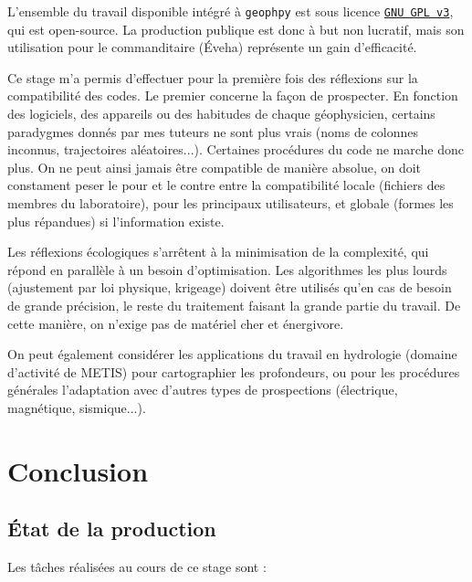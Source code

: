 \documentclass[12pt]{article}
\begin{document}
    L'ensemble du travail disponible intégré à \texttt{geophpy} est sous licence \href{https://www.gnu.org/licenses/gpl-3.0.en.html}{\texttt{GNU GPL v3}}, qui est open-source. La production publique est donc à but non lucratif, mais son utilisation pour le commanditaire (Éveha) représente un gain d'efficacité.

    Ce stage m'a permis d'effectuer pour la première fois des réflexions sur la compatibilité des codes. Le premier concerne la façon de prospecter. En fonction des logiciels, des appareils ou des habitudes de chaque géophysicien, certains paradygmes donnés par mes tuteurs ne sont plus vrais (noms de colonnes inconnus, trajectoires aléatoires...). Certaines procédures du code ne marche donc plus. On ne peut ainsi jamais être compatible de manière absolue, on doit constament peser le pour et le contre entre la compatibilité locale (fichiers des membres du laboratoire), pour les principaux utilisateurs, et globale (formes les plus répandues) si l'information existe.

    \vskip 15pt

    Les réflexions écologiques s'arrêtent à la minimisation de la complexité, qui répond en parallèle à un besoin d'optimisation. Les algorithmes les plus lourds (ajustement par loi physique, krigeage) doivent être utilisés qu'en cas de besoin de grande précision, le reste du traitement faisant la grande partie du travail. De cette manière, on n'exige pas de matériel cher et énergivore.

    On peut également considérer les applications du travail en hydrologie (domaine d'activité de METIS) pour cartographier les profondeurs, ou pour les procédures générales l'adaptation avec d'autres types de prospections (électrique, magnétique, sismique...).

\section{Conclusion}
\subsection{État de la production}

    Les tâches réalisées au cours de ce stage sont :
\end{document}
